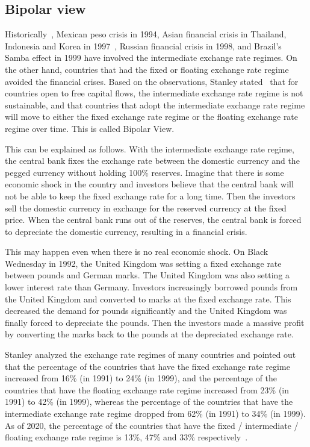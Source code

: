 \documentclass[dvipdfmx,a4paper]{article}
\begin{document}
\subsection{Bipolar view}

Historically~\cite{fischer2001exchange}, Mexican peso crisis in 1994, Asian financial crisis in Thailand, Indonesia and Korea in 1997~\cite{radelet1998east}, Russian financial crisis in 1998, and Brazil's Samba effect in 1999 have involved the intermediate exchange rate regimes. On the other hand, countries that had the fixed or floating exchange rate regime avoided the financial crises. Based on the observations, Stanley stated~\cite{fischer2001exchange} that for countries open to free capital flows, the intermediate exchange rate regime is not sustainable, and that countries that adopt the intermediate exchange rate regime will move to either the fixed exchange rate regime or the floating exchange rate regime over time. This is called Bipolar View.

This can be explained as follows. With the intermediate exchange rate regime, the central bank fixes the exchange rate between the domestic currency and the pegged currency without holding 100\% reserves. Imagine that there is some economic shock in the country and investors believe that the central bank will not be able to keep the fixed exchange rate for a long time. Then the investors sell the domestic currency in exchange for the reserved currency at the fixed price. When the central bank runs out of the reserves, the central bank is forced to depreciate the domestic currency, resulting in a financial crisis.

This may happen even when there is no real economic shock. On Black Wednesday in 1992, the United Kingdom was setting a fixed exchange rate between pounds and German marks. The United Kingdom was also setting a lower interest rate than Germany. Investors increasingly borrowed pounds from the United Kingdom and converted to marks at the fixed exchange rate. This decreased the demand for pounds significantly and the United Kingdom was finally forced to depreciate the pounds. Then the investors made a massive profit by converting the marks back to the pounds at the depreciated exchange rate.

Stanley analyzed the exchange rate regimes of many countries and pointed out that the percentage of the countries that have the fixed exchange rate regime increased from 16\% (in 1991) to 24\% (in 1999), and the percentage of the countries that have the floating exchange rate regime increased from 23\% (in 1991) to 42\% (in 1999), whereas the percentage of the countries that have the intermediate exchange rate regime dropped from 62\% (in 1991) to 34\% (in 1999). As of 2020, the percentage of the countries that have the fixed / intermediate / floating exchange rate regime is 13\%, 47\% and 33\% respectively~\cite{imfreport}.
\end{document}
